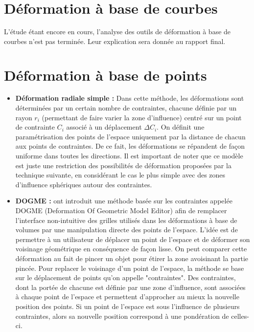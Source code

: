 \section{Déformation à base de courbes}
L'étude étant encore en cours, l'analyse des outils de déformation à
base de courbes n'est pas terminée. Leur explication sera donnée au
rapport final.

\section{Déformation à base de points}
\begin{itemize}
\item{\textbf{Déformation radiale simple :}} Dans cette méthode, les
  déformations sont déterminées par un certain nombre de contraintes,
  chacune définie par un rayon $r_i$ (permettant de faire varier la
  zone d'influence) centré sur un point de contrainte $C_i$ associé à
  un déplacement $\Delta C_i$. On définit une paramétrisation des
  points de l'espace uniquement par la distance de chacun aux points
  de contraintes. De ce fait, les déformations se répandent de façon
  uniforme dans toutes les directions. Il est important de noter que
  ce modèle est juste une restriction des possibilités de déformation
  proposées par la technique suivante, en considérant le cas le plus
  simple avec des zones d'influence sphériques autour des contraintes.
\item{\textbf{DOGME :}} \cite{BB91} ont introduit une méthode basée
  sur les contraintes appelée DOGME (Deformation Of Geometric Model
  Editor) afin de remplacer l'interface non-intuitive des grilles
  utilisés dans les déformations à base de volumes par une
  manipulation directe des points de l'espace. L'idée est de permettre
  à un utilisateur de déplacer un point de l'espace et de déformer son
  voisinage géométrique en conséquence de façon lisse. On peut
  comparer cette déformation au fait de pincer un objet pour étirer la
  zone avoisinant la partie pincée. Pour replacer le voisinage d'un
  point de l'espace, la méthode se base sur le déplacement de points
  qu'on appelle "contraintes". Des contraintes, dont la portée de
  chacune est définie par une zone d'influence, sont associées à
  chaque point de l'espace et permettent d'approcher au mieux la
  nouvelle position des points. Si un point de l'espace est sous
  l'influence de plusieurs contraintes, alors sa nouvelle position
  correspond à une pondération de celles-ci.
\end{itemize}

